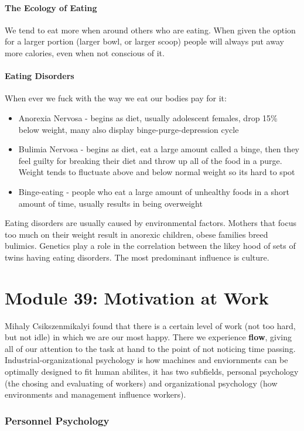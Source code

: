 \documentclass[12pt]{article}
\begin{document}
\subsection*{The Ecology of Eating}
We tend to eat more when around others who are eating. When given the option for a larger portion (larger bowl, or larger scoop) people will always put away more calories, even when not conscious of it.
\subsection*{Eating Disorders}
When ever we fuck with the way we eat our bodies pay for it:
\begin{itemize}
\item Anorexia Nervosa - begins as diet, usually adolescent females, drop 15\% below weight, many also display binge-purge-depression cycle
\item Bulimia Nervosa - begins as diet, eat a large amount called a binge, then they feel guilty for breaking their diet and throw up all of the food in a purge. Weight tends to fluctuate above and below normal weight so its hard to spot
\item Binge-eating - people who eat a large amount of unhealthy foods in a short amount of time, usually results in being overweight
\end{itemize}
Eating disorders are usually caused by environmental factors. Mothers that focus too much on their weight result in anorexic children, obese families breed bulimics. Genetics play a role in the correlation between the likey hood of sets of twins having eating disorders.  The most predominant influence is culture. 

\part*{Module 39: Motivation at Work}
Mihaly Csikszenmikalyi found that there is a certain level of work (not too hard, but not idle) in which we are our most happy. There we experience \textbf{flow}, giving all of our attention to the task at hand to the point of not noticing time passing. Industrial-organizational psychology is how machines and enviornments can be optimally designed to fit human abilites, it has two subfields, personal psychology (the chosing and evaluating of workers) and organizational psychology (how environments and management influence workers). 
\section{Personnel Psychology}
\end{document}
